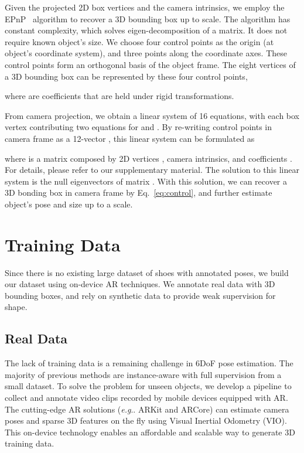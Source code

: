 \documentclass[runningheads]{llncs}
\makeatletter
\DeclareRobustCommand\onedot{\futurelet\@let@token\@onedot}
\def\@onedot{\ifx\@let@token.\else.\null\fi\xspace}
\def\eg{\emph{e.g}\onedot} \def\Eg{\emph{E.g}\onedot}
\makeatother
\begin{document}
Given the projected 2D box vertices and the camera intrinsics, we employ the EPnP~\cite{Lepetit_2009_EPnP} algorithm to recover a 3D bounding box up to scale. The algorithm has constant complexity, which solves eigen-decomposition of a  matrix. It does not require known object's size. We choose four control points  as the origin (at object's coordinate system), and three points along the coordinate axes. These control points form an orthogonal basis of the object frame. The eight vertices of a 3D bounding box can be represented by these four control points,

where  are coefficients that are held under rigid transformations.

From camera projection, we obtain a linear system of 16 equations, with each box vertex contributing two equations for  and . By re-writing control points in camera frame as a 12-vector , this linear system can be formulated as

where  is a  matrix composed by 2D vertices , camera intrinsics, and coefficients . For details, please refer to our supplementary material. The solution to this linear system is the null eigenvectors of matrix . With this solution, we can recover a 3D bonding box in camera frame by Eq.~\ref{eq:control}, and further estimate object's pose and size up to a scale. 

\section{Training Data}
Since there is no existing large dataset of shoes with annotated poses, we build our dataset using on-device AR techniques. We annotate real data with 3D bounding boxes, and rely on synthetic data to provide weak supervision for shape.

\subsection{Real Data}
The lack of training data is a remaining challenge in 6DoF pose estimation. The majority of previous methods are instance-aware with full supervision from a small dataset. To solve the problem for unseen objects, we develop a pipeline to collect and annotate video clips recorded by mobile devices equipped with AR. The cutting-edge AR solutions (\eg ARKit and ARCore) can estimate camera poses and sparse 3D features on the fly using Visual Inertial Odometry (VIO). This on-device technology enables an affordable and scalable way to generate 3D training data.
\end{document}

